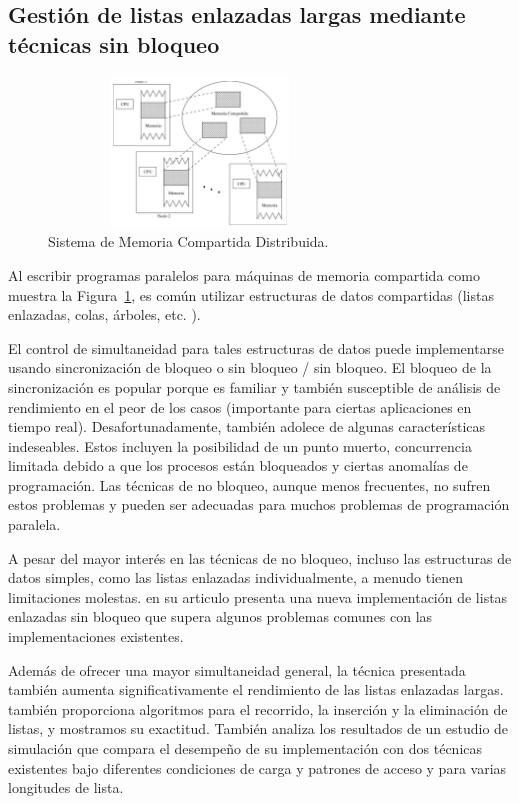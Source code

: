 \documentclass[10pt,journal]{IEEEtran}
\begin{document}
\subsection{\textbf{Gestión de listas enlazadas largas mediante técnicas sin bloqueo}}
\begin{figure}[H]
 \begin{center}
       \includegraphics[width=8cm, height=4cm]{figuras/4.JPG}
      \caption{Sistema de Memoria Compartida Distribuida.}
      \label{f4} 
      \end{center}
\end{figure}
Al escribir programas paralelos para máquinas de memoria compartida como muestra la Figura~\ref{f4}, es común utilizar estructuras de datos compartidas (listas enlazadas, colas, árboles, etc. ).\par El control de simultaneidad para tales estructuras de datos puede implementarse usando sincronización de bloqueo o sin bloqueo / sin bloqueo. El bloqueo de la sincronización es popular porque es familiar y también susceptible de análisis de rendimiento en el peor de los casos (importante para ciertas aplicaciones en tiempo real). Desafortunadamente, también adolece de algunas características indeseables. Estos incluyen la posibilidad de un punto muerto, concurrencia limitada debido a que los procesos están bloqueados y ciertas anomalías de programación. Las técnicas de no bloqueo, aunque menos frecuentes, no sufren estos problemas y pueden ser adecuadas para muchos problemas de programación paralela.\par
A pesar del mayor interés en las técnicas de no bloqueo, incluso las estructuras de datos simples, como las listas enlazadas individualmente, a menudo tienen limitaciones molestas.  \citep{faro} en su articulo presenta una nueva implementación de listas enlazadas sin bloqueo que supera algunos problemas comunes con las implementaciones existentes.\par Además de ofrecer una mayor simultaneidad general, la técnica presentada también aumenta significativamente el rendimiento de las listas enlazadas largas. \citep{faro} también proporciona algoritmos para el recorrido, la inserción y la eliminación de listas, y mostramos su exactitud. También analiza los resultados de un estudio de simulación que compara el desempeño de su implementación con dos técnicas existentes bajo diferentes condiciones de carga y patrones de acceso y para varias longitudes de lista.
\end{document}
